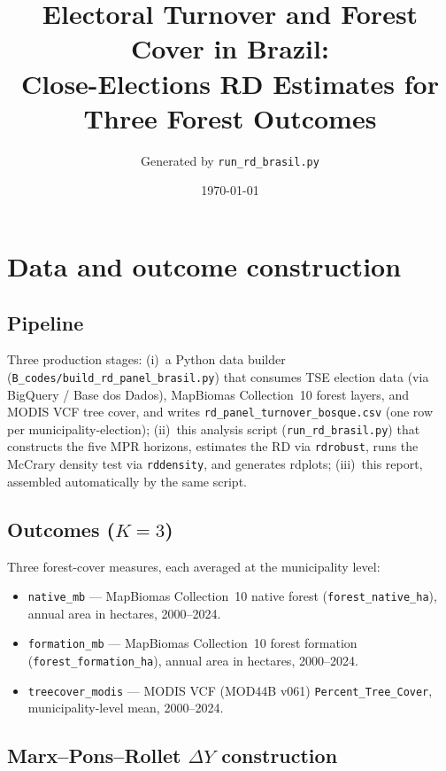 \documentclass[11pt]{article}
\title{Electoral Turnover and Forest Cover in Brazil:\\
       Close-Elections RD Estimates for Three Forest Outcomes}
\author{Generated by \texttt{run\_rd\_brasil.py}}
\date{\today}
\begin{document}
\maketitle
\tableofcontents
\clearpage


\section{Data and outcome construction}

\subsection{Pipeline}

Three production stages: (i)~a Python data builder
(\texttt{B\_codes/build\_rd\_panel\_brasil.py}) that consumes TSE election
data (via BigQuery / Base dos Dados), MapBiomas Collection~10 forest layers,
and MODIS VCF tree cover, and writes
\texttt{rd\_panel\_turnover\_bosque.csv} (one row per municipality-election);
(ii)~this analysis script (\texttt{run\_rd\_brasil.py}) that constructs the
five MPR horizons, estimates the RD via \texttt{rdrobust}, runs the McCrary
density test via \texttt{rddensity}, and generates rdplots;
(iii)~this report, assembled automatically by the same script.

\subsection{Outcomes ($K=3$)}

Three forest-cover measures, each averaged at the municipality level:

\begin{itemize}
  \item \texttt{native\_mb} --- MapBiomas Collection~10 native forest
        (\texttt{forest\_native\_ha}), annual area in hectares, 2000--2024.
  \item \texttt{formation\_mb} --- MapBiomas Collection~10 forest formation
        (\texttt{forest\_formation\_ha}), annual area in hectares, 2000--2024.
  \item \texttt{treecover\_modis} --- MODIS VCF (MOD44B v061)
        \texttt{Percent\_Tree\_Cover}, municipality-level mean, 2000--2024.
\end{itemize}

\subsection{Marx--Pons--Rollet $\Delta Y$ construction}
\end{document}
